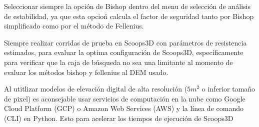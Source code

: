 Seleccionar siempre la opci\'on de Bishop dentro del menu de selecci\'on de an\'alisis de estabilidad, ya que esta opcio\'n calcula el factor de seguridad tanto por Bishop simplificado como por el m\'etodo de Fellenius.

Siempre realizar corridas de prueba en Scoops3D con par\'ametros de resistencia estimados, para evaluar la optima configuraci\'on de Scoops3D, espec\'ificamente para verificar que la caja de b\'usqueda no sea una limitante al momento de evaluar los m\'etodos bishop y fellenius al DEM usado.

Al utitlizar modelos de elevaci\'on digital de alta resoluci\'on ($5m^{2}$ o inferior tama\~no de pixel) es aconsejable usar servicios de computaci\'on en la nube como Google Cloud Platform (GCP) o Amazon Web Services (AWS) y la l\'inea de comando (CLI) en Python. Esto para acelerar los tiempos de ejecuci\'on de Scoops3D